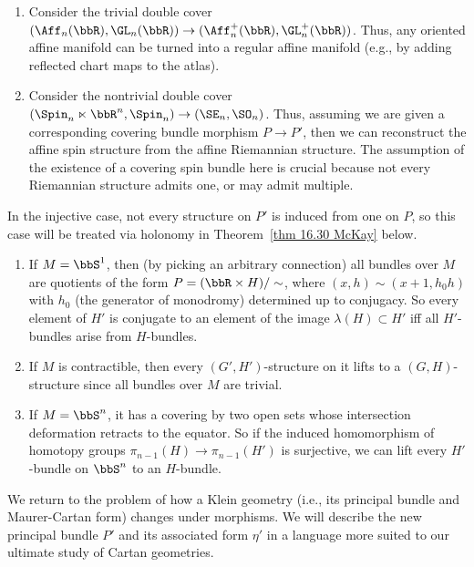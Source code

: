 \begin{example}
    \begin{enumerate}
        \item Consider the trivial double cover $(\Aff_n(\bbR),\GL_n(\bbR))\to (\Aff_n^+(\bbR),\GL_n^+(\bbR))$. Thus, any oriented affine manifold can be turned into a regular affine manifold (e.g., by adding reflected chart maps to the atlas).
        \item Consider the nontrivial double cover $(\Spin_n\ltimes\bbR^n,\Spin_n)\to (\SE_n,\SO_n)$. Thus, assuming we are given a corresponding covering bundle morphism $P\to P'$, then we can reconstruct the affine spin structure from the affine Riemannian structure. The assumption of the existence of a covering spin bundle here is crucial because not every Riemannian structure admits one, or may admit multiple.
    \end{enumerate}
\end{example}

In the injective case, not every structure on $P'$ is induced from one on $P$, so this case will be treated via holonomy in Theorem~\ref{thm 16.30 McKay} below.

\begin{example}
    \begin{enumerate}
        \item If $M=\bbS^1$, then (by picking an arbitrary connection) all bundles over $M$ are quotients of the form $P=(\bbR\times H)\slash \sim$, where $(x,h)\sim (x+1,h_0h)$ with $h_0$ (the generator of monodromy) determined up to conjugacy. So every element of $H'$ is conjugate to an element of the image $\lambda(H)\subset H'$ iff all $H'$-bundles arise from $H$-bundles.
        \item If $M$ is contractible, then every $(G',H')$-structure on it lifts to a $(G,H)$-structure since all bundles over $M$ are trivial.
        \item If $M=\bbS^n$, it has a covering by two open sets whose intersection deformation retracts to the equator. So if the induced homomorphism of homotopy groups $\pi_{n-1}(H)\to \pi_{n-1}(H')$ is surjective, we can lift every $H'$-bundle on $\bbS^n$ to an $H$-bundle.
    \end{enumerate}
\end{example}

We return to the problem of how a Klein geometry (i.e., its principal bundle and Maurer-Cartan form) changes under morphisms. We will describe the new principal bundle $P'$ and its associated form $\eta'$ in a language more suited to our ultimate study of Cartan geometries.

